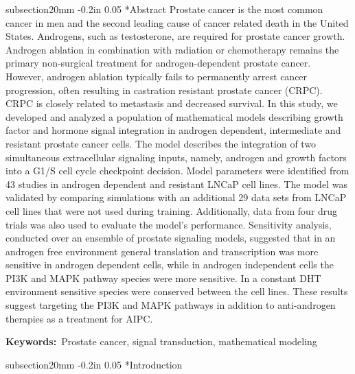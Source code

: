 \documentclass[12pt]{article}
\makeatletter
\renewcommand\section{\@startsection
	{subsection}{2}{0mm}
	{-0.2in}
	{0.05\baselineskip}
	{\normalfont\large\bfseries}}
\makeatother
\begin{document}
\section*{Abstract}
Prostate cancer is the most common cancer in men and the second leading cause of cancer related death in the United States. 
Androgens, such as testosterone, are required for prostate cancer growth. 
Androgen ablation in combination with radiation or chemotherapy remains the primary non-surgical treatment for androgen-dependent prostate cancer. 
However, androgen ablation typically fails to permanently arrest cancer progression, often resulting in castration resistant prostate cancer (CRPC). 
CRPC is closely related to metastasis and decreased survival. 
In this study, we developed and analyzed a population of mathematical models describing growth factor and hormone signal integration in androgen dependent, intermediate and resistant prostate cancer cells. 
The model describes the integration of two simultaneous extracellular signaling inputs, namely, androgen and growth factors into a G1/S cell cycle checkpoint decision. 
Model parameters were identified from 43 studies in androgen dependent and resistant LNCaP cell lines. 
The model was validated by comparing simulations with an additional 29 data sets from LNCaP cell lines that were not used during training. 
Additionally, data from four drug trials was also used to evaluate the model’s performance.
Sensitivity analysis, conducted over an ensemble of prostate signaling models, suggested that in an androgen free environment general translation and transcription was more sensitive in androgen dependent cells, while in androgen independent cells the PI3K and MAPK pathway species were more sensitive. 
In a constant DHT environment sensitive species were conserved between the cell lines. 
These results suggest targeting the PI3K and MAPK pathways in addition to anti-androgen therapies as a treatment for AIPC.

\vspace{0.5in}
{\noindent \textbf{Keywords:}~Prostate cancer, signal transduction, mathematical modeling}

\pagebreak

\setcounter{page}{1}

\linenumbers

\section*{Introduction}
\end{document}
